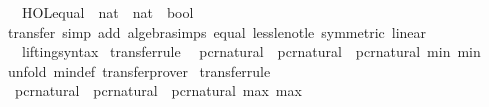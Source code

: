 \begin{isabellebody}
\ \ \ {\isachardoublequoteopen}HOL{\isachardot}{\kern0pt}equal\ {\isacharcolon}{\kern0pt}{\isacharcolon}{\kern0pt}\ nat\ {\isasymRightarrow}\ nat\ {\isasymRightarrow}\ bool{\isachardoublequoteclose}\isanewline
%
\isadelimproof
\ \ %
\endisadelimproof
%
\isatagproof
\isacommand{{\isachardot}{\kern0pt}}\isamarkupfalse%
%
\endisatagproof
{\isafoldproof}%
%
\isadelimproof
\isanewline
%
\endisadelimproof
\isanewline
{}\isamarkupfalse%
%
\isadelimproof
\ %
\endisadelimproof
%
\isatagproof
{}\isamarkupfalse%
\isanewline
{}\isamarkupfalse%
\ {\isacharparenleft}{\kern0pt}transfer{\isacharcomma}{\kern0pt}\ simp\ add{\isacharcolon}{\kern0pt}\ algebra{\isacharunderscore}{\kern0pt}simps\ equal\ less{\isacharunderscore}{\kern0pt}le{\isacharunderscore}{\kern0pt}not{\isacharunderscore}{\kern0pt}le\ {\isacharbrackleft}{\kern0pt}symmetric{\isacharbrackright}{\kern0pt}\ linear{\isacharparenright}{\kern0pt}{\isacharplus}{\kern0pt}%
\endisatagproof
{\isafoldproof}%
%
\isadelimproof
%
\endisadelimproof
\isanewline
\isanewline
{}\isamarkupfalse%
\isanewline
\isanewline
{}\isamarkupfalse%
\isanewline
\ \ \ lifting{\isacharunderscore}{\kern0pt}syntax\isanewline
{}\isanewline
\isanewline
{}\isamarkupfalse%
\ {\isacharbrackleft}{\kern0pt}transfer{\isacharunderscore}{\kern0pt}rule{\isacharbrackright}{\kern0pt}{\isacharcolon}{\kern0pt}\isanewline
\ \ {\isacartoucheopen}{\isacharparenleft}{\kern0pt}pcr{\isacharunderscore}{\kern0pt}natural\ {\isacharequal}{\kern0pt}{\isacharequal}{\kern0pt}{\isacharequal}{\kern0pt}{\isachargreater}{\kern0pt}\ pcr{\isacharunderscore}{\kern0pt}natural\ {\isacharequal}{\kern0pt}{\isacharequal}{\kern0pt}{\isacharequal}{\kern0pt}{\isachargreater}{\kern0pt}\ pcr{\isacharunderscore}{\kern0pt}natural{\isacharparenright}{\kern0pt}\ min\ min{\isacartoucheclose}\isanewline
%
\isadelimproof
\ \ %
\endisadelimproof
%
\isatagproof
{}\isamarkupfalse%
\ {\isacharparenleft}{\kern0pt}unfold\ min{\isacharunderscore}{\kern0pt}def{\isacharparenright}{\kern0pt}\ transfer{\isacharunderscore}{\kern0pt}prover%
\endisatagproof
{\isafoldproof}%
%
\isadelimproof
\isanewline
%
\endisadelimproof
\isanewline
{}\isamarkupfalse%
\ {\isacharbrackleft}{\kern0pt}transfer{\isacharunderscore}{\kern0pt}rule{\isacharbrackright}{\kern0pt}{\isacharcolon}{\kern0pt}\isanewline
\ \ {\isacartoucheopen}{\isacharparenleft}{\kern0pt}pcr{\isacharunderscore}{\kern0pt}natural\ {\isacharequal}{\kern0pt}{\isacharequal}{\kern0pt}{\isacharequal}{\kern0pt}{\isachargreater}{\kern0pt}\ pcr{\isacharunderscore}{\kern0pt}natural\ {\isacharequal}{\kern0pt}{\isacharequal}{\kern0pt}{\isacharequal}{\kern0pt}{\isachargreater}{\kern0pt}\ pcr{\isacharunderscore}{\kern0pt}natural{\isacharparenright}{\kern0pt}\ max\ max{\isacartoucheclose}\isanewline

\end{isabellebody}
